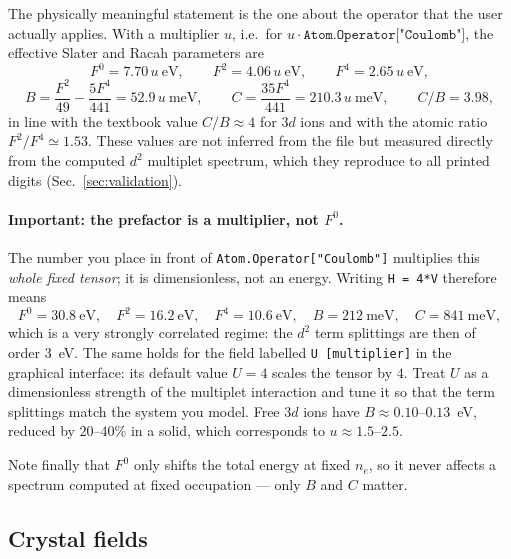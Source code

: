 \documentclass[11pt,a4paper]{article}
\newcommand{\op}[1]{\texttt{#1}}
\begin{document}
The physically meaningful statement is the one about the operator that the user
actually applies.  With a multiplier $u$, i.e.\ for
$u\cdot\op{Atom.Operator["Coulomb"]}$, the effective Slater and Racah parameters
are
\begin{equation}
  F^{0}=7.70\,u\ \mathrm{eV},\qquad
  F^{2}=4.06\,u\ \mathrm{eV},\qquad
  F^{4}=2.65\,u\ \mathrm{eV},
\end{equation}
\begin{equation}
  B=\frac{F^{2}}{49}-\frac{5F^{4}}{441}=52.9\,u\ \mathrm{meV},
  \qquad
  C=\frac{35F^{4}}{441}=210.3\,u\ \mathrm{meV},
  \qquad C/B = 3.98 ,
\end{equation}
in line with the textbook value $C/B\approx 4$ for $3d$ ions and with the atomic
ratio $F^{2}/F^{4}\simeq 1.53$.  These values are not inferred from the file but
measured directly from the computed $d^2$ multiplet spectrum, which they
reproduce to all printed digits (Sec.~\ref{sec:validation}).

\paragraph{Important: the prefactor is a multiplier, not $F^0$.}
The number you place in front of \op{Atom.Operator["Coulomb"]} multiplies this
\emph{whole fixed tensor}; it is dimensionless, not an energy.  Writing
\op{H = 4*V} therefore means
\begin{equation}
  F^{0}=30.8\ \mathrm{eV},\quad F^{2}=16.2\ \mathrm{eV},\quad F^{4}=10.6\ \mathrm{eV},
  \quad B=212\ \mathrm{meV},\quad C=841\ \mathrm{meV},
\end{equation}
which is a very strongly correlated regime: the $d^2$ term splittings are then of
order $3$~eV.  The same holds for the field labelled \op{U [multiplier]} in the
graphical interface: its default value $U=4$ scales the tensor by $4$.  Treat
$U$ as a dimensionless strength of the multiplet interaction and tune it so that
the term splittings match the system you model.  Free $3d$
ions have $B\approx 0.10$--$0.13$~eV, reduced by $20$--$40\%$ in a solid, which
corresponds to $u\approx 1.5$--$2.5$.

Note finally that $F^0$ only shifts the total energy at fixed $n_e$, so it never
affects a spectrum computed at fixed occupation --- only $B$ and $C$ matter.

\subsection{Crystal fields}
\label{sec:cf}
\end{document}
